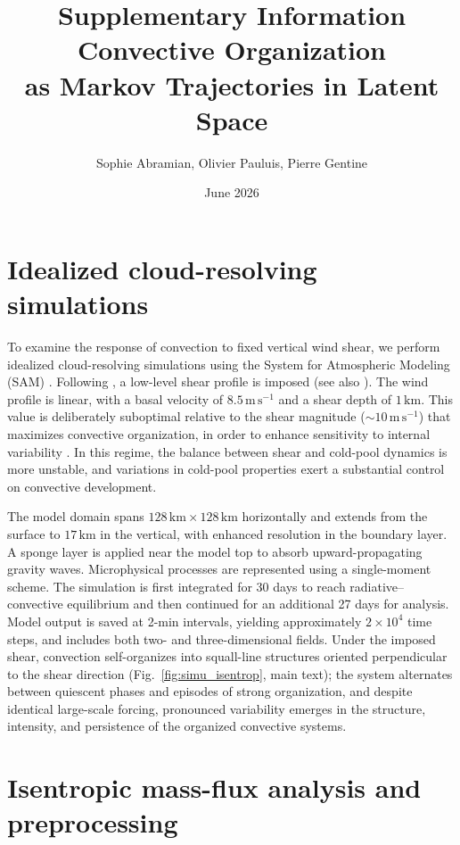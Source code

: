 \documentclass[11pt]{article}
\title{Supplementary Information \\
Convective Organization \\ as Markov Trajectories in Latent Space}
\author{Sophie Abramian, Olivier Pauluis, Pierre Gentine}
\date{June 2026}
\begin{document}
\maketitle


\tableofcontents

\newpage

\section{Idealized cloud-resolving simulations}

To examine the response of convection to fixed vertical wind shear, we perform idealized cloud-resolving simulations using the System for Atmospheric Modeling (SAM) \cite{khairoutdinov2003}. Following \cite{muller2013impact}, a low-level shear profile is imposed (see also \cite{rotunno1988theory, houze1977structure, robe2001effect}). The wind profile is linear, with a basal velocity of $8.5\,\mathrm{m\,s^{-1}}$ and a shear depth of $1\,\mathrm{km}$. This value is deliberately suboptimal relative to the shear magnitude ($\sim10\,\mathrm{m\,s^{-1}}$) that maximizes convective organization, in order to enhance sensitivity to internal variability \cite{abramian2022shear}. In this regime, the balance between shear and cold-pool dynamics is more unstable, and variations in cold-pool properties exert a substantial control on convective development.

The model domain spans $128\,\mathrm{km} \times 128\,\mathrm{km}$ horizontally and extends from the surface to $17\,\mathrm{km}$ in the vertical, with enhanced resolution in the boundary layer. A sponge layer is applied near the model top to absorb upward-propagating gravity waves. Microphysical processes are represented using a single-moment scheme. The simulation is first integrated for 30 days to reach radiative--convective equilibrium and then continued for an additional 27 days for analysis. Model output is saved at 2-min intervals, yielding approximately $2\times10^{4}$ time steps, and includes both two- and three-dimensional fields. Under the imposed shear, convection self-organizes into squall-line structures oriented perpendicular to the shear direction (Fig.~\ref{fig:simu_isentrop}, main text); the system alternates between quiescent phases and episodes of strong organization, and despite identical large-scale forcing, pronounced variability emerges in the structure, intensity, and persistence of the organized convective systems.

\section{Isentropic mass-flux analysis and preprocessing}
\end{document}
